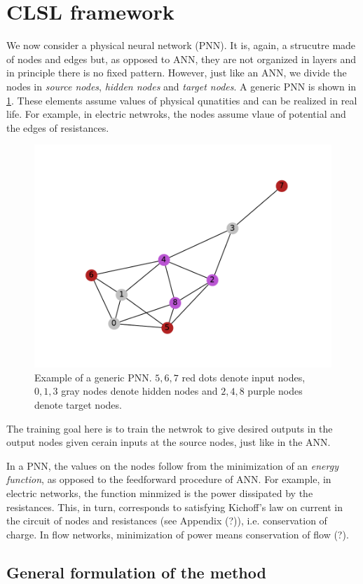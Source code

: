 \documentclass[11pt]{article}
\begin{document}
\newpage

\section{CLSL framework}

We now consider a physical neural network (PNN). It is, again, a strucutre made of nodes and edges but, as opposed to ANN, they are not organized in layers and in principle there is no fixed pattern. However, just like an ANN, we divide the nodes in \textit{source nodes}, \textit{hidden nodes} and \textit{target nodes}. A generic PNN is shown in \cref{fig:general_graph}. These elements assume values of physical qunatities and can be realized in real life. For example, in electric netwroks, the nodes assume vlaue of potential and the edges of resistances.
\begin{figure}[h]
    \centering
    \includegraphics[width=0.6\columnwidth]{../figures_tex/general_graph.pdf}
    \caption{Example of a generic PNN. $5,6,7$ red dots denote input nodes, $0,1,3$ gray nodes denote hidden nodes and $2,4,8$ purple nodes denote target nodes.}
    \label{fig:general_graph}
\end{figure} 
The training goal here is to train the netwrok to give desired outputs in the output nodes given cerain inputs at the source nodes, just like in the ANN.

In a PNN, the values on the nodes follow from the minimization of an \textit{energy function}, as opposed to the feedforward procedure of ANN. For example, in electric networks, the function minmized is the power dissipated by the resistances. This, in turn, corresponds to satisfying Kichoff's law on current in the circuit of nodes and resistances (see Appendix (?)), i.e. conservation of charge. In flow networks, minimization of power means conservation of flow (?).

\subsection{General formulation of the method}
\end{document}
